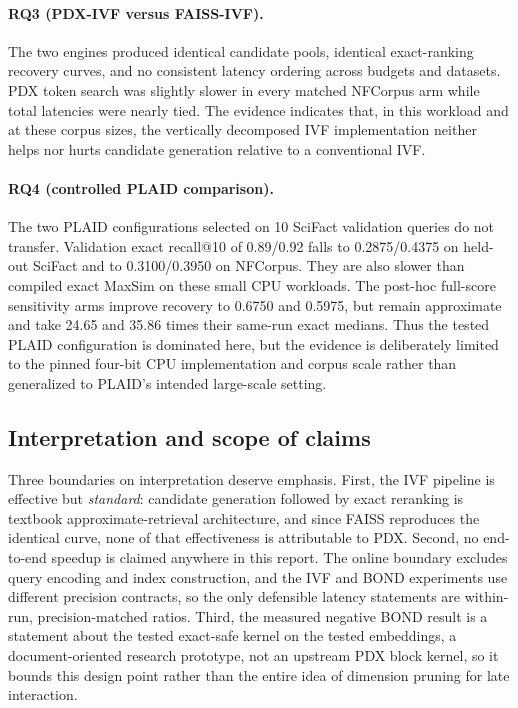 \paragraph{RQ3 (PDX-IVF versus FAISS-IVF).} The two engines produced
identical candidate pools, identical exact-ranking recovery curves, and no
consistent latency ordering across budgets and datasets. PDX token search was
slightly slower in every matched NFCorpus arm while total latencies were
nearly tied. The evidence indicates that, in this workload and at these corpus
sizes, the vertically decomposed IVF implementation neither helps nor hurts
candidate generation relative to a conventional IVF.

\paragraph{RQ4 (controlled PLAID comparison).} The two PLAID configurations
selected on 10 SciFact validation queries do not transfer. Validation exact
recall@10 of 0.89/0.92 falls to 0.2875/0.4375 on held-out SciFact and to
0.3100/0.3950 on NFCorpus. They are also slower than compiled exact MaxSim on
these small CPU workloads. The post-hoc full-score sensitivity arms improve
recovery to 0.6750 and 0.5975, but remain approximate and take 24.65 and 35.86
times their same-run exact medians. Thus the tested PLAID configuration is
dominated here, but the evidence is deliberately limited to the pinned
four-bit CPU implementation and corpus scale rather than generalized to
PLAID's intended large-scale setting.

\subsection{Interpretation and scope of claims}

Three boundaries on interpretation deserve emphasis. First, the IVF pipeline
is effective but \emph{standard}: candidate generation followed by exact
reranking is textbook approximate-retrieval architecture, and since FAISS
reproduces the identical curve, none of that effectiveness is attributable to
PDX. Second, no end-to-end speedup is claimed anywhere in this report. The
online boundary excludes query encoding and index construction, and the IVF
and BOND experiments use different precision contracts, so the only defensible
latency statements are within-run, precision-matched ratios. Third, the
measured negative BOND result is a statement about the tested exact-safe
kernel on the tested embeddings, a document-oriented research prototype, not
an upstream PDX block kernel, so it bounds this design point rather than the
entire idea of dimension pruning for late interaction.

